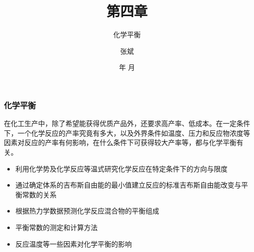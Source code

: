 \documentclass[dvipsnames, svgnames, x11names]{beamer}
\title{第四章}
\subtitle{化学平衡}
\author{张斌}
\institute[理工系]{河北农业大学 理工系}
\date{\the\year 年 \the\month 月}
\begin{document}
	\begin{frame}
		\titlepage
		\thispagestyle{empty}
		\addtocounter{framenumber}{-1}
	\end{frame}


	\begin{frame}
		\frametitle{化学平衡}
	
		在化工生产中，除了希望能获得优质产品外，还要求高产率、低成本。在一定条件下，一个化学反应的产率究竟有多大，以及外界条件如温度、压力和反应物浓度等因素对反应的产率有何影响，在什么条件下可获得较大产率等，都与化学平衡有关。
	
		\begin{itemize}
			\item[\bullet] 利用化学势及化学反应等温式研究化学反应在特定条件下的方向与限度
			\item[\bullet] 通过确定体系的吉布斯自由能的最小值建立反应的标准吉布斯自由能改变与平衡常数的关系
			\item[\bullet] 根据热力学数据预测化学反应混合物的平衡组成
			\item[\bullet] 平衡常数的测定和计算方法
			\item[\bullet] 反应温度等一些因素对化学平衡的影响
		\end{itemize}
	
	\end{frame}

	\begin{frame}{}
        \begin{center}
            {\Huge {}}
        \end{center}
		\tableofcontents
		\thispagestyle{empty}
		\addtocounter{framenumber}{-1}
	\end{frame}







\end{document}
